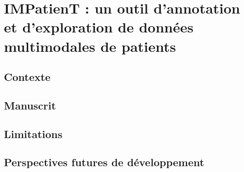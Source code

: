\chapter{IMPatienT : un outil d’annotation et d’exploration de données multimodales de patients}
\section{Contexte}
\section{Manuscrit}
\section{Limitations}
\section{Perspectives futures de développement}
